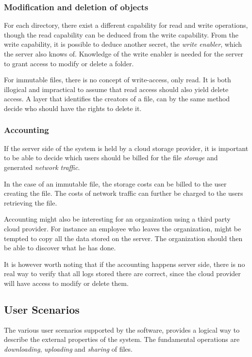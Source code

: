 \documentclass[pdftex,english,10pt,b5paper,twoside]{book}
\begin{document}
\subsubsection{Modification and deletion of objects}

For each directory, there exist a different capability for read and write
operations, though the read capability can be deduced from the write
capability. From the write capability, it is possible to deduce another secret,
the \emph{write enabler}, which the server also knows of.  Knowledge of the
write enabler is needed for the server to grant access to modify or delete a
folder.

For immutable files, there is no concept of write-access, only read. It is both
illogical and impractical to assume that read access should also yield delete
access. A layer that identifies the creators of a file, can by the same method
decide who should have the rights to delete it.

\subsubsection{Accounting}

If the server side of the system is held by a cloud storage provider, it
is important to be able to decide which users should be billed for the file
\emph{storage} and generated \emph{network traffic}.

In the case of an immutable file, the storage costs can be billed to the user
creating the file. The costs of network traffic can further be charged to the
users retrieving the file.

Accounting might also be interesting for an organization using a third party
cloud provider. For instance an employee who leaves the organization, might be
tempted to copy all the data stored on the server. The organization should then
be able to discover what he has done.

It is however worth noting that if the accounting happens server side, there is
no real way to verify that all logs stored there are correct, since the cloud
provider will have access to modify or delete them.

\subsection{User Scenarios}

The various user scenarios supported by the software, provides a logical way to
describe the external properties of the system. The fundamental operations are
\emph{downloading}, \emph{uploading} and \emph{sharing} of files.
\end{document}
